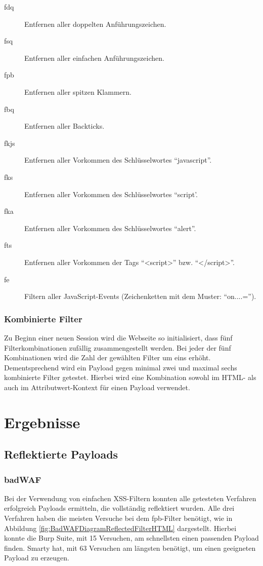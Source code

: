 \begin{description}
	\item[fdq] Entfernen aller doppelten Anführungszeichen.
	\item[fsq] Entfernen aller einfachen Anführungszeichen.
	\item[fpb] Entfernen aller spitzen Klammern.
	\item[fbq] Entfernen aller Backticks.
	\item[fkjs] Entfernen aller Vorkommen des Schlüsselwortes ``javascript''.
	\item[fks] Entfernen aller Vorkommen des Schlüsselwortes ``script'.
	\item[fka] Entfernen aller Vorkommen des Schlüsselwortes ``alert''.
	\item[fts] Entfernen aller Vorkommen der Tags ``<script>'' bzw. ``</script>''.
	\item[fe] Filtern aller JavaScript-Events (Zeichenketten mit dem Muster: ``on....='').
\end{description}

\subsubsection{Kombinierte Filter}
Zu Beginn einer neuen Session wird die Webseite so initialisiert, dass fünf Filterkombinationen zufällig zusammengestellt werden. Bei jeder der fünf Kombinationen wird die Zahl der gewählten Filter um eins erhöht. Dementsprechend wird ein Payload gegen minimal zwei und maximal sechs kombinierte Filter getestet. Hierbei wird eine Kombination sowohl im HTML- als auch im Attributwert-Kontext für einen Payload verwendet.

\section{Ergebnisse}\label{eval:ReflectedResultsTestRuns}

\subsection{Reflektierte Payloads}
\subsubsection{badWAF}


Bei der Verwendung von einfachen XSS-Filtern konnten alle getesteten Verfahren erfolgreich Payloads ermitteln, die vollständig reflektiert wurden.
Alle drei Verfahren haben die meisten Versuche bei dem fpb-Filter benötigt, wie in Abbildung \ref{fig:BadWAFDiagramReflectedFilterHTML} dargestellt. Hierbei konnte die Burp Suite, mit 15 Versuchen, am schnellsten einen passenden Payload finden. Smarty hat, mit 63 Versuchen am längsten benötigt, um einen geeigneten Payload zu erzeugen.

